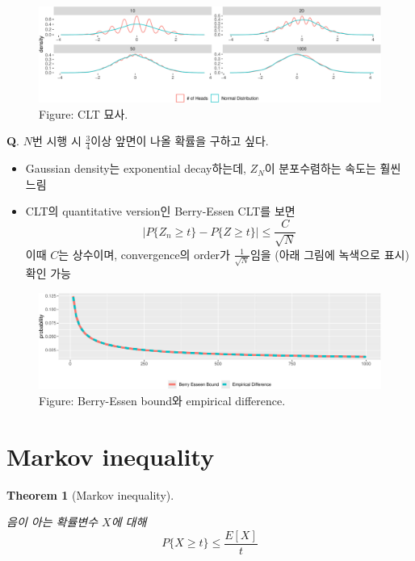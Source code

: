 \documentclass[
  letterpaper,
  DIV=11,
  numbers=noendperiod]{scrreprt}
\theoremstyle{definition}
\theoremstyle{plain}
\newtheorem{theorem}{Theorem}[chapter]
\theoremstyle{plain}
\theoremstyle{definition}
\theoremstyle{plain}
\theoremstyle{definition}
\theoremstyle{remark}
\begin{document}
\begin{figure}[H]

{\centering \includegraphics[width=0.7\linewidth,height=\textheight,keepaspectratio]{ineq_files/figure-pdf/unnamed-chunk-2-1.pdf}

}

\caption{Figure: CLT 묘사.}

\end{figure}%

\textbf{Q}. \(N\)번 시행 시 \(\frac{3}{4}\)이상 앞면이 나올 확률을
구하고 싶다.

\begin{itemize}
\item
  Gaussian density는 exponential decay하는데, \(Z_N\)이 분포수렴하는
  속도는 훨씬 느림
\item
  CLT의 quantitative version인 Berry-Essen CLT를 보면 \[
  |P\{Z_n \geq t\} - P\{Z \geq t\} | \leq \frac{C}{\sqrt{N}}
  \] 이때 \(C\)는 상수이며, convergence의 order가
  \(\frac{1}{\sqrt{N}}\)임을 (아래 그림에 녹색으로 표시) 확인 가능
\end{itemize}

\begin{figure}[H]

{\centering \includegraphics[width=0.7\linewidth,height=\textheight,keepaspectratio]{ineq_files/figure-pdf/unnamed-chunk-3-1.pdf}

}

\caption{Figure: Berry-Essen bound와 empirical difference.}

\end{figure}%

\section{Markov inequality}\label{markov-inequality}

\begin{theorem}[Markov
inequality]\protect\hypertarget{thm-markovineq}{}\label{thm-markovineq}

음이 아는 확률변수 \(X\)에 대해 \[
P\{ X\geq t\} \leq \frac{E[X]}{t}
\]

\end{theorem}
\end{document}
